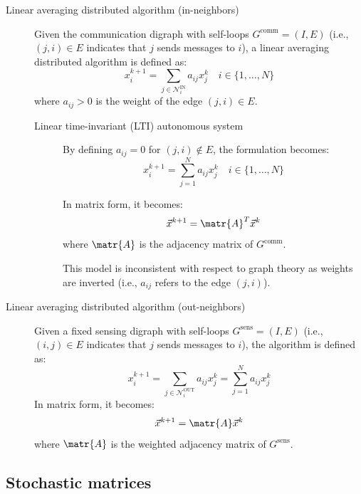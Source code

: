 \begin{description}
    \item[Linear averaging distributed algorithm (in-neighbors)] 
        Given the communication digraph with self-loops $G^\text{comm} = (I, E)$ (i.e., $(j, i) \in E$ indicates that $j$ sends messages to $i$), a linear averaging distributed algorithm is defined as:
        \[ x_i^{k+1} = \sum_{j \in \mathcal{N}_i^\text{IN}} a_{ij} x_j^k \quad i \in \{1, \dots, N\} \]
        where $a_{ij} > 0$ is the weight of the edge $(j, i) \in E$.

        \begin{description}
            \item[Linear time-invariant (LTI) autonomous system] 
                By defining $a_{ij} = 0$ for $(j, i) \notin E$, the formulation becomes:
                \[ x_i^{k+1} = \sum_{j=1}^N a_{ij} x_j^k  \quad i \in \{ 1, \dots, N \} \]

                In matrix form, it becomes:
                \[ \vec{x}^{k+1} = \matr{A}^T \vec{x}^k \]
                where $\matr{A}$ is the adjacency matrix of $G^\text{comm}$.

                \begin{remark}
                    This model is inconsistent with respect to graph theory as weights are inverted (i.e., $a_{ij}$ refers to the edge $(j, i)$).
                \end{remark}
        \end{description}

    \item[Linear averaging distributed algorithm (out-neighbors)] 
        Given a fixed sensing digraph with self-loops $G^\text{sens} = (I, E)$ (i.e., $(i, j) \in E$ indicates that $j$ sends messages to $i$), the algorithm is defined as:
        \[ x_i^{k+1} = \sum_{j \in \mathcal{N}_i^\text{OUT}} a_{ij} x_j^k = \sum_{j=1}^{N} a_{ij} x_j^k \]
        In matrix form, it becomes:
        \[ \vec{x}^{k+1} = \matr{A} \vec{x}^k \]
        where $\matr{A}$ is the weighted adjacency matrix of $G^\text{sens}$.
\end{description}


\subsection{Stochastic matrices}

